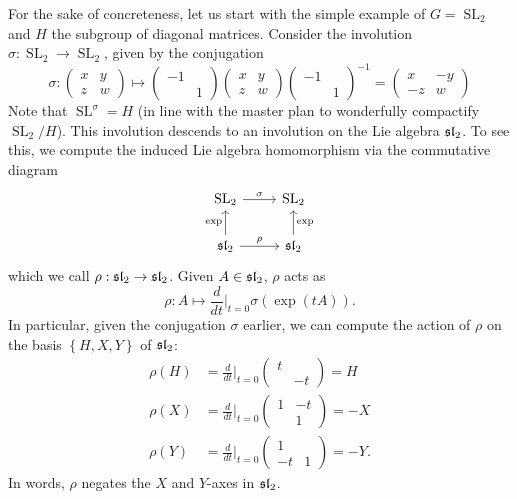 \documentclass{../mathnotes}
\DeclareMathOperator{\SL}{SL}
\begin{document}
For the sake of concreteness, let us start with the simple example of $G=\SL_2$ and $H$ the subgroup of diagonal matrices.
Consider the involution $\sigma:\SL_2\to\SL_2$, given by the conjugation
\begin{equation*}
    \sigma:
    \begin{pmatrix}
        x & y\\
        z & w
    \end{pmatrix}
    \mapsto
    \begin{pmatrix}
        -1 &\\
        & 1
    \end{pmatrix}
    \begin{pmatrix}
        x & y\\
        z & w
    \end{pmatrix}
    \begin{pmatrix}
        -1 &\\
        & 1
    \end{pmatrix}^{-1}
    =
    \begin{pmatrix}
        x & -y\\
        -z & w
    \end{pmatrix}
\end{equation*}
Note that $\SL^\sigma=H$ (in line with the master plan to wonderfully compactify $\SL_2/H$).
This involution descends to an involution on the Lie algebra $\mathfrak{sl}_2$. To see this, we compute the induced Lie algebra
homomorphism via the commutative diagram
\begin{equation*}
\begin{tikzcd}
    \SL_2\arrow{r}{\sigma}&\SL_2\\
    \fr{sl}_2\arrow{u}{\exp}\arrow{r}{\rho}&\fr{sl}_2\arrow{u}[swap]{\exp}
\end{tikzcd}
\end{equation*}
which we call $\rho:\mathfrak{sl}_2\to\mathfrak{sl}_2$. Given $A\in\mathfrak{sl}_2$, $\rho$ acts as
\begin{equation*}
    \rho: A\mapsto \frac{d}{dt}\bigg|_{t=0}\sigma(\exp(t A)).
\end{equation*}
In particular, given the conjugation $\sigma$ earlier, we can compute the action of $\rho$ on the basis $\left\{ H,X,Y \right\}$
of $\mathfrak{sl}_2$:
\begin{align*}
    \rho(H)&=\frac{d}{dt}\bigg|_{t=0}\begin{pmatrix}t&\\&-t\end{pmatrix}=H\\
    \rho(X)&=\frac{d}{dt}\bigg|_{t=0}\begin{pmatrix}1&-t\\&1\end{pmatrix}=-X\\
    \rho(Y)&=\frac{d}{dt}\bigg|_{t=0}\begin{pmatrix}1&\\-t&1\end{pmatrix}=-Y.
\end{align*}
In words, $\rho$ negates the $X$ and $Y$-axes in $\mathfrak{sl}_2$. 


\newpage



\end{document}
